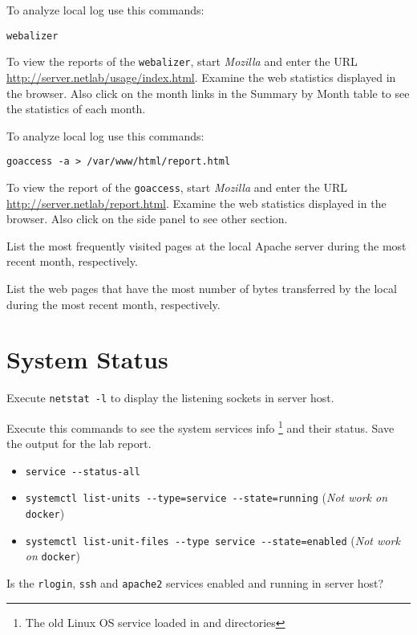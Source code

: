 \documentclass{../UTNetLab}
\begin{document}
    To analyze local log use this commands:
    \begin{lstlisting}
webalizer
    \end{lstlisting}
    
    To view the reports of the \lstinline{webalizer}, start \textit{Mozilla} and enter the URL \url{http://server.netlab/usage/index.html}.
    Examine the web statistics displayed in the browser.
    Also click on the month links in the Summary by Month table to see the statistics of each month.

    To analyze local log use this commands:
    \begin{lstlisting}
goaccess -a > /var/www/html/report.html
    \end{lstlisting}
    
    To view the report of the \lstinline{goaccess}, start \textit{Mozilla} and enter the URL \url{http://server.netlab/report.html}.
    Examine the web statistics displayed in the browser.
    Also click on the side panel to see other section.

    \begin{report}
        \item List the most frequently visited pages at the local Apache server during the most recent month, respectively.
        
        \item List the web pages that have the most number of bytes transferred by the local during the most recent month, respectively.
    \end{report}

\section{System Status}
    Execute \lstinline{netstat -l} to display the listening sockets in server host.

    Execute this commands to see the system services info \footnote{The old Linux OS service loaded in and  directories} and their status.
    Save the output for the lab report.
    \begin{itemize}
        \item \lstinline{service --status-all}
        \item \lstinline[morekeywords={[2]list-units}]{systemctl list-units --type=service --state=running} (\textit{Not work on} \lstinline{docker})
        \item \lstinline[morekeywords={[2]list-unit-files}]{systemctl list-unit-files --type service --state=enabled} (\textit{Not work on} \lstinline{docker})
    \end{itemize}
    
    \begin{report}
        \item Is the \lstinline{rlogin}, \lstinline{ssh} and \lstinline{apache2} services enabled and running in server host?
    \end{report}
\end{document}
